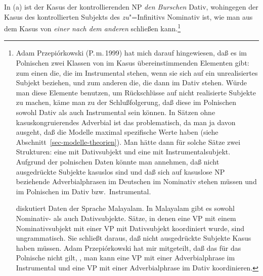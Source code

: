In (a) ist der Kasus der kontrollierenden NP \emph{den Burschen} Dativ, wohingegen
der Kasus des kontrollierten Subjekts des \emph{zu}"=Infinitivs Nominativ ist,
wie man aus dem Kasus von \emph{einer nach dem anderen} schließen kann.\footnote{
        Adam Przepi{\'o}rkowski (P.\,m.\,1999) hat mich darauf hingewiesen,
        daß es im Polnischen zwei Klassen von im Kasus übereinstimmenden Elementen
        gibt: zum einen die, die im Instrumental stehen, wenn sie sich auf ein
        unrealisiertes Subjekt beziehen, und zum anderen die, die dann im Dativ stehen.
        Würde man diese Elemente benutzen, um Rückschlüsse auf nicht realisierte Subjekte zu
        machen, käme man zu der Schlußfolgerung, daß diese im Polnischen sowohl Dativ als auch Instrumental
        sein können. In Sätzen ohne kasuskongruierendes Adverbial ist das problematisch, da man ja
        davon ausgeht, daß die Modelle maximal spezifische Werte haben (siehe
        Abschnitt~\ref{sec-modelle-theorien}). Man hätte dann für solche Sätze zwei Strukturen: eine
        mit Dativsubjekt und eine mit Instrumentalsubjekt.
        Aufgrund der polnischen Daten könnte man annehmen, daß nicht ausgedrückte Subjekte kasuslos sind
        und daß sich auf kasuslose NP beziehende Adverbialphrasen im Deutschen im Nominativ stehen müssen
        und im Polnischen im Dativ bzw.\ Instrumental.

        \citet{Hennis89} diskutiert Daten der Sprache Malayalam. In
        Malayalam gibt es sowohl Nominativ- als auch Dativsubjekte. Sätze, in denen eine VP mit
        einem Nominativsubjekt mit einer VP mit Dativsubjekt koordiniert wurde, sind ungrammatisch.
        Sie schließt daraus, daß nicht ausgedrückte Subjekte Kasus haben müssen.
        Adam Przepi{\'o}rkowski hat mir mitgeteilt, daß das für das Polnische nicht gilt,
        \dash, man kann eine VP mit einer Adverbialphrase im Instrumental und eine VP
        mit einer Adverbialphrase im Dativ koordinieren.

}
